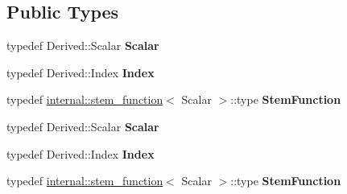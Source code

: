 \subsection*{Public Types}
\begin{DoxyCompactItemize}
\item 
\mbox{\label{class_eigen_1_1_matrix_function_return_value_acc3bd501f55ba5865fcbebd8077f5444}} 
typedef Derived\+::\+Scalar {\bfseries Scalar}
\item 
\mbox{\label{class_eigen_1_1_matrix_function_return_value_a699ba3f4e1f573aec4212d1375df4abc}} 
typedef Derived\+::\+Index {\bfseries Index}
\item 
\mbox{\label{class_eigen_1_1_matrix_function_return_value_a1c4568cb2dc9683383dbf1729f3fe51e}} 
typedef \hyperlink{struct_eigen_1_1internal_1_1stem__function}{internal\+::stem\+\_\+function}$<$ Scalar $>$\+::type {\bfseries Stem\+Function}
\item 
\mbox{\label{class_eigen_1_1_matrix_function_return_value_acc3bd501f55ba5865fcbebd8077f5444}} 
typedef Derived\+::\+Scalar {\bfseries Scalar}
\item 
\mbox{\label{class_eigen_1_1_matrix_function_return_value_a699ba3f4e1f573aec4212d1375df4abc}} 
typedef Derived\+::\+Index {\bfseries Index}
\item 
\mbox{\label{class_eigen_1_1_matrix_function_return_value_a1c4568cb2dc9683383dbf1729f3fe51e}} 
typedef \hyperlink{struct_eigen_1_1internal_1_1stem__function}{internal\+::stem\+\_\+function}$<$ Scalar $>$\+::type {\bfseries Stem\+Function}
\end{DoxyCompactItemize}
